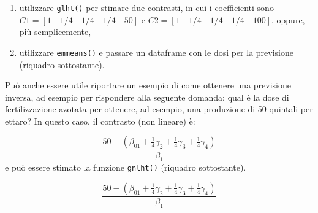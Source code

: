 \documentclass[
  12pt,
]{book}
\providecommand{\tightlist}{%
  \setlength{\itemsep}{0pt}\setlength{\parskip}{0pt}}
\begin{document}
\begin{enumerate}
\def\labelenumi{\arabic{enumi}.}
\tightlist
\item
  utilizzare \texttt{glht()} per stimare due contrasti, in cui i coefficienti sono \(C1 = [1 \quad 1/4 \quad 1/4 \quad 1/4 \quad 50]\) e \(C2 = [1 \quad 1/4 \quad 1/4 \quad 1/4 \quad 100]\), oppure, più semplicemente,
\item
  utilizzare \texttt{emmeans()} e passare un dataframe con le dosi per la previsione (riquadro sottostante).
\end{enumerate}

Può anche essere utile riportare un esempio di come ottenere una previsione inversa, ad esempio per rispondere alla seguente domanda: qual è la dose di fertilizzazione azotata per ottenere, ad esempio, una produzione di 50 quintali per ettaro? In questo caso, il contrasto (non lineare) è:

\[\frac{50 - (\beta_{01} + \frac{1}{4} \gamma_2 + \frac{1}{4}\gamma_3 + \frac{1}{4}\gamma_4 )}{\beta_1}\]
e può essere stimato la funzione \texttt{gnlht()} (riquadro sottostante).

\begin{equation}
\frac{50 - (\beta_{01} + \frac{1}{4} \gamma_2 + \frac{1}{4}\gamma_3 + \frac{1}{4}\gamma_4 )}{\beta_1}
\label{eq:eq104}
\end{equation}

\footnotesize
\vspace{12pt}
\end{document}
